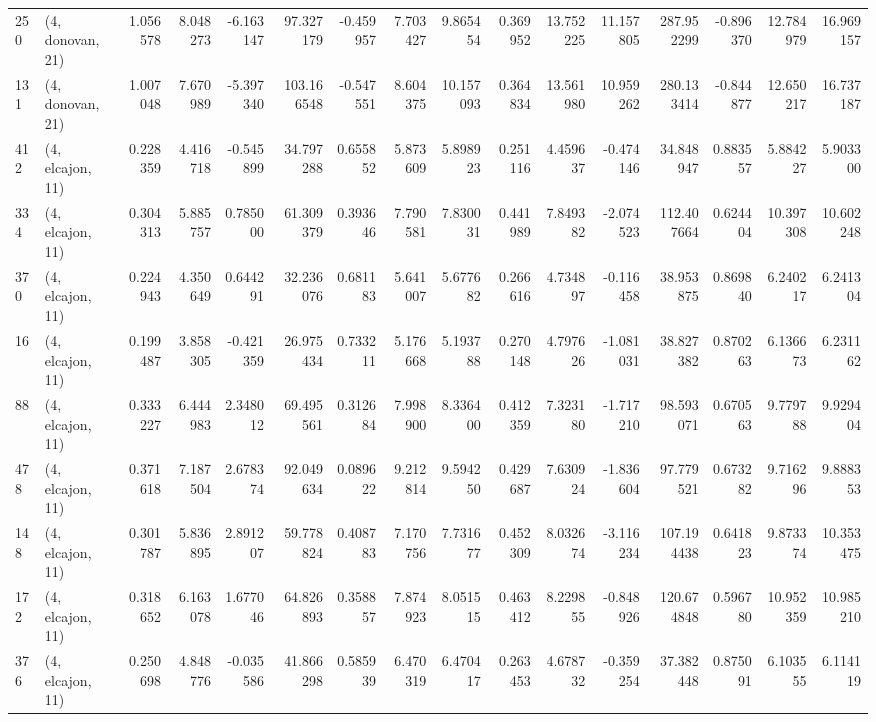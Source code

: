 \begin{tabular}{llrrrrrrrrrrrrrr}
250 &  (4, donovan, 21) &   1.056578 &   8.048273 &  -6.163147 &    97.327179 &  -0.459957 &   7.703427 &   9.865454 &  0.369952 &  13.752225 &  11.157805 &   287.952299 & -0.896370 &  12.784979 &  16.969157 \\
131 &  (4, donovan, 21) &   1.007048 &   7.670989 &  -5.397340 &   103.166548 &  -0.547551 &   8.604375 &  10.157093 &  0.364834 &  13.561980 &  10.959262 &   280.133414 & -0.844877 &  12.650217 &  16.737187 \\
412 &  (4, elcajon, 11) &   0.228359 &   4.416718 &  -0.545899 &    34.797288 &   0.655852 &   5.873609 &   5.898923 &  0.251116 &   4.459637 &  -0.474146 &    34.848947 &  0.883557 &   5.884227 &   5.903300 \\
334 &  (4, elcajon, 11) &   0.304313 &   5.885757 &   0.785000 &    61.309379 &   0.393646 &   7.790581 &   7.830031 &  0.441989 &   7.849382 &  -2.074523 &   112.407664 &  0.624404 &  10.397308 &  10.602248 \\
370 &  (4, elcajon, 11) &   0.224943 &   4.350649 &   0.644291 &    32.236076 &   0.681183 &   5.641007 &   5.677682 &  0.266616 &   4.734897 &  -0.116458 &    38.953875 &  0.869840 &   6.240217 &   6.241304 \\
16  &  (4, elcajon, 11) &   0.199487 &   3.858305 &  -0.421359 &    26.975434 &   0.733211 &   5.176668 &   5.193788 &  0.270148 &   4.797626 &  -1.081031 &    38.827382 &  0.870263 &   6.136673 &   6.231162 \\
88  &  (4, elcajon, 11) &   0.333227 &   6.444983 &   2.348012 &    69.495561 &   0.312684 &   7.998900 &   8.336400 &  0.412359 &   7.323180 &  -1.717210 &    98.593071 &  0.670563 &   9.779788 &   9.929404 \\
478 &  (4, elcajon, 11) &   0.371618 &   7.187504 &   2.678374 &    92.049634 &   0.089622 &   9.212814 &   9.594250 &  0.429687 &   7.630924 &  -1.836604 &    97.779521 &  0.673282 &   9.716296 &   9.888353 \\
148 &  (4, elcajon, 11) &   0.301787 &   5.836895 &   2.891207 &    59.778824 &   0.408783 &   7.170756 &   7.731677 &  0.452309 &   8.032674 &  -3.116234 &   107.194438 &  0.641823 &   9.873374 &  10.353475 \\
172 &  (4, elcajon, 11) &   0.318652 &   6.163078 &   1.677046 &    64.826893 &   0.358857 &   7.874923 &   8.051515 &  0.463412 &   8.229855 &  -0.848926 &   120.674848 &  0.596780 &  10.952359 &  10.985210 \\
376 &  (4, elcajon, 11) &   0.250698 &   4.848776 &  -0.035586 &    41.866298 &   0.585939 &   6.470319 &   6.470417 &  0.263453 &   4.678732 &  -0.359254 &    37.382448 &  0.875091 &   6.103555 &   6.114119 \\

\end{tabular}

